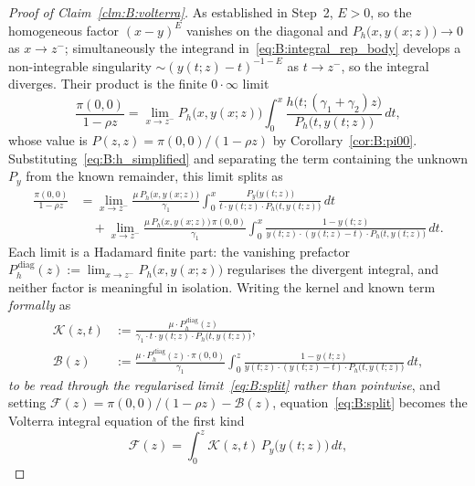 \begin{proof}[Proof of Claim~\ref{clm:B:volterra}]
As established in Step~2, $E>0$, so the homogeneous factor $(x-y)^E$ vanishes on the
diagonal and $P_h\bigl(x,y(x;z)\bigr)\to0$ as $x\to z^-$; simultaneously the integrand
in~\eqref{eq:B:integral_rep_body} develops a non-integrable singularity
$\sim(y(t;z)-t)^{-1-E}$ as $t\to z^-$, so the integral diverges. Their product is the
finite $0\cdot\infty$ limit
\begin{equation}
    \frac{\pi(0,0)}{1-\rho z}
    = \lim_{x\to z^-} P_h\bigl(x,y(x;z)\bigr)
      \int_0^x \frac{h\bigl(t;(\gamma_1+\gamma_2)z\bigr)}{P_h\bigl(t,y(t;z)\bigr)}\,dt,
    \label{eq:B:diag_limit}
\end{equation}
whose value is $P(z,z)=\pi(0,0)/(1-\rho z)$ by Corollary~\ref{cor:B:pi00}.
Substituting~\eqref{eq:B:h_simplified} and separating the term containing the unknown
$P_y$ from the known remainder, this limit splits as
\begin{align}
    \frac{\pi(0,0)}{1-\rho z}
    &= \lim_{x\to z^-}\frac{\mu\,P_h\bigl(x,y(x;z)\bigr)}{\gamma_1}
       \int_0^x \frac{P_y\bigl(y(t;z)\bigr)}{t\cdot y(t;z)\cdot P_h\bigl(t,y(t;z)\bigr)}\,dt
    \nonumber\\
    &\quad
    + \lim_{x\to z^-}\frac{\mu\,P_h\bigl(x,y(x;z)\bigr)\,\pi(0,0)}{\gamma_1}
       \int_0^x \frac{1-y(t;z)}{y(t;z)\cdot(y(t;z)-t)\cdot P_h\bigl(t,y(t;z)\bigr)}\,dt.
    \label{eq:B:split}
\end{align}
Each limit is a Hadamard finite part: the vanishing prefactor
$P_h^{\,\mathrm{diag}}(z):=\lim_{x\to z^-}P_h\bigl(x,y(x;z)\bigr)$ regularises the
divergent integral, and neither factor is meaningful in isolation. Writing the kernel
and known term \emph{formally} as
\begin{align}
    \mathcal{K}(z,t) &:= \frac{\mu\cdot P_h^{\,\mathrm{diag}}(z)}
                                {\gamma_1\cdot t\cdot y(t;z)\cdot P_h\bigl(t,y(t;z)\bigr)},
    \label{eq:B:kernel}\\[6pt]
    \mathcal{B}(z) &:= \frac{\mu\cdot P_h^{\,\mathrm{diag}}(z)\cdot\pi(0,0)}{\gamma_1}
                        \int_0^z
                        \frac{1-y(t;z)}{y(t;z)\cdot(y(t;z)-t)\cdot P_h\bigl(t,y(t;z)\bigr)}
                        \,dt,
    \label{eq:B:Bdef}
\end{align}
\emph{to be read through the regularised limit~\eqref{eq:B:split} rather than pointwise},
and setting $\mathcal{F}(z)=\pi(0,0)/(1-\rho z)-\mathcal{B}(z)$,
equation~\eqref{eq:B:split} becomes the Volterra integral equation of the first kind
\begin{equation}
    \mathcal{F}(z) = \int_0^z \mathcal{K}(z,t)\,P_y\!\bigl(y(t;z)\bigr)\,dt,

\end{equation}
\end{proof}
